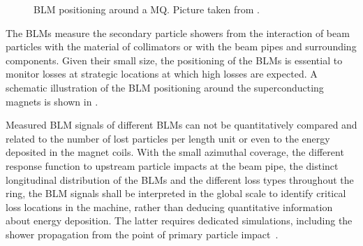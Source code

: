 \begin{figure}[htbp]
  \centering
  \caption{BLM positioning around a MQ. Picture taken from \cite{EPAC04:THPLT012}.}  
  \label{pic:16071902}
  \end{figure}



The BLMs measure the secondary particle showers from the interaction of beam particles with the material of collimators or with the beam pipes and surrounding components. Given their small size, the positioning of the BLMs is essential to monitor losses at strategic locations at which high losses are expected. A schematic illustration of the BLM positioning around the superconducting magnets is shown in . 

Measured BLM signals of different BLMs can not be quantitatively compared and related to the number of lost particles per length unit or even to the energy deposited in the magnet coils. With the small azimuthal coverage, the different response function to upstream particle impacts at the beam pipe, the distinct longitudinal distribution of the BLMs and the different loss types throughout the ring, the BLM signals shall be interpreted in the global scale to identify critical loss locations in the machine, rather than deducing quantitative information about energy deposition. The latter requires dedicated simulations, including the shower propagation from the point of primary particle impact~\cite{PAC09:TH5RFP035}. 

